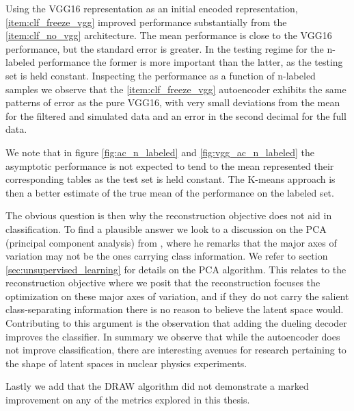 Using the VGG16 representation as an initial encoded representation, \ref{item:clf_freeze_vgg} improved performance substantially from the \ref{item:clf_no_vgg} architecture. The mean performance is  close to the VGG16 performance, but the standard error is greater. In the testing regime for the n-labeled performance the former is more important than the latter, as the testing set is held constant. Inspecting the performance as a function of n-labeled samples we observe that the \ref{item:clf_freeze_vgg} autoencoder exhibits the same patterns of error as the pure VGG16, with very small deviations from the mean for the filtered and simulated data and an error in the second decimal for the full data.

We note that in figure \ref{fig:ac_n_labeled} and \ref{fig:vgg_ac_n_labeled} the asymptotic performance is not expected to tend to the mean represented their corresponding tables as the test set is held constant. The K-means approach is then a better estimate of the true mean of the performance on the labeled set.

The obvious question is then why the reconstruction objective does not aid in classification. To find a plausible answer we look to a discussion on the PCA (principal component analysis) from \cite{Jolliffe1982}, where he remarks that the major axes of variation may not be the ones carrying class information. We refer to section \ref{sec:unsupervised_learning} for details on the PCA algorithm. This relates to the reconstruction objective where we posit that the reconstruction focuses the optimization on these major axes of variation, and if they do not carry the salient class-separating information there is no reason to believe the latent space would. Contributing to this argument is the observation that adding the dueling decoder improves the classifier. In summary we observe that while the autoencoder does not improve classification, there are interesting avenues for research pertaining to the shape of latent spaces in nuclear physics experiments.

Lastly we add that the DRAW algorithm did not demonstrate a marked improvement on any of the metrics explored in this thesis.



